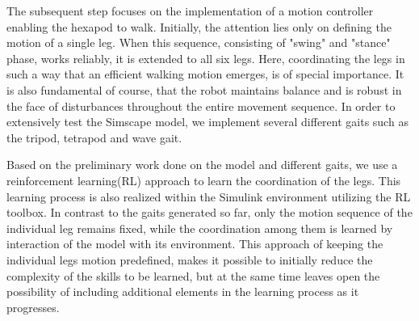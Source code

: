 The subsequent step focuses on the implementation of a motion controller enabling the hexapod to walk.
Initially, the attention lies only on defining the motion of a single leg.
When this sequence, consisting of "swing" and "stance" phase, works reliably, it is extended to all six legs.
Here, coordinating the legs in such a way that an efficient walking motion emerges, is of special importance.
It is also fundamental of course, that the robot maintains balance and is robust in the face of disturbances throughout the entire movement sequence.
In order to extensively test the Simscape model, we implement several different gaits such as the tripod, tetrapod and wave gait.

Based on the preliminary work done on the model and different gaits, we use a reinforcement learning(RL) approach to learn the coordination of the legs.
This learning process is also realized within the Simulink environment utilizing the RL toolbox.
In contrast to the gaits generated so far, only the motion sequence of the individual leg remains fixed, while the coordination among them is learned by interaction of the model with its environment. 
This approach of keeping the individual legs motion predefined, makes it possible to initially reduce the complexity of the skills to be learned, but at the same time leaves open the possibility of including additional elements in the learning process as it progresses.

